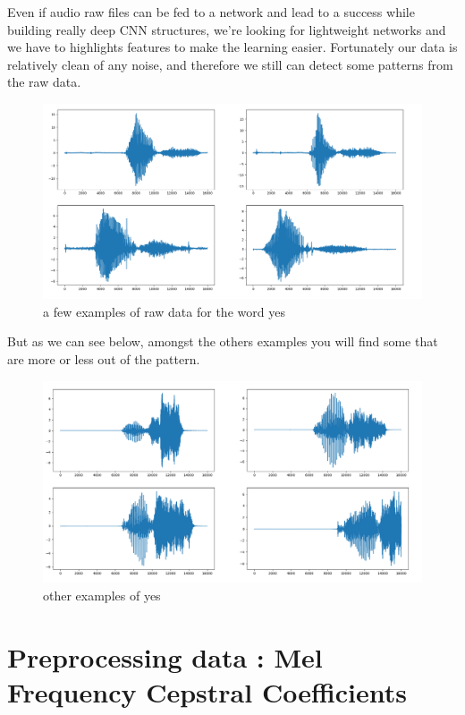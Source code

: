 Even if audio raw files can be fed to a network and lead to a success while building really deep CNN structures, we're looking for lightweight networks and we have to highlights features to make the learning easier. Fortunately our data is relatively clean of any noise, and therefore we still can detect some patterns from the raw data. 

\begin{figure}[!h]
    \centering
    \includegraphics[width=1\textwidth]{chapters/pictures/raw_yes.PNG}
    \caption{a few examples of raw data for the word yes}
    \label{fig:raw_yes}
\end{figure}

But as we can see below, amongst the others examples you will find some that are more or less out of the pattern.


\begin{figure}[!h]
    \centering
    \includegraphics[width=1\textwidth]{chapters/pictures/also_yes.PNG}
    \caption{other examples of yes}
    \label{fig:also_yes}
\end{figure}


\section{Preprocessing data : Mel Frequency Cepstral Coefficients}

